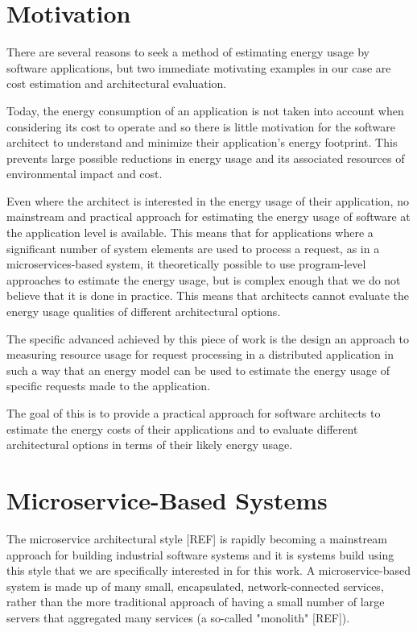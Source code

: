 \section{Motivation}

There are several reasons to seek a method of estimating energy usage by software applications, but two immediate motivating examples in our case are cost estimation and architectural evaluation.

Today, the energy consumption of an application is not taken into account when considering its cost to operate and so there is little motivation for the software architect to understand and minimize their application's energy footprint.  This prevents large possible reductions in energy usage and its associated resources of environmental impact and cost.

Even where the architect is interested in the energy usage of their application, no mainstream and practical approach for estimating the energy usage of software at the application level is available.  This means that for applications where a significant number of system elements are used to process a request, as in a microservices-based system, it theoretically possible to use program-level approaches to estimate the energy usage, but is complex enough that we do not believe that it is done in practice.  This means that architects cannot evaluate the energy usage qualities of different architectural options.

The specific advanced achieved by this piece of work is the design an approach to measuring resource usage for request processing in a distributed application in such a way that an energy model can be used to estimate the energy usage of specific requests made to the application.

The goal of this is to provide a practical approach for software architects to estimate the energy costs of their applications and to evaluate different architectural options in terms of their likely energy usage.

\section{Microservice-Based Systems}

The microservice architectural style [REF] is rapidly becoming a mainstream approach for building industrial software systems and it is systems build using this style that we are specifically interested in for this work.
A microservice-based system is made up of many small, encapsulated, network-connected services, rather than the more traditional approach of having a small number of large servers that aggregated many services (a so-called "monolith" [REF]).

